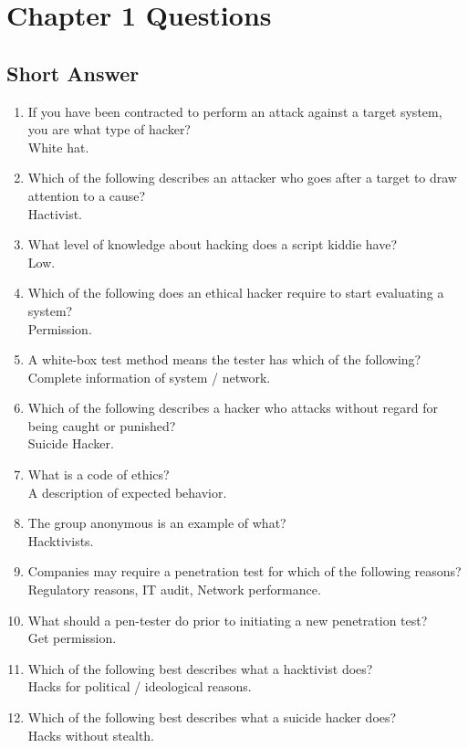 \section{Chapter 1 Questions}
\subsection{Short Answer}
\begin{enumerate}
    \item If you have been contracted to perform an attack against a target system, you are what type of hacker?\\White hat.
    \item Which of the following describes an attacker who goes after a target to draw attention to a cause?\\Hactivist.
    \item What level of knowledge about hacking does a script kiddie have?\\Low.
    \item Which of the following does an ethical hacker require to start evaluating a system?\\Permission.
    \item A white-box test method means the tester has which of the following?\\Complete information of system / network.
    \item Which of the following describes a hacker who attacks without regard for being caught or punished?\\Suicide Hacker.
    \item What is a code of ethics?\\A description of expected behavior.
    \item The group anonymous is an example of what?\\Hacktivists.
    \item Companies may require a penetration test for which of the following reasons?\\Regulatory reasons, IT audit, Network performance.
    \item What should a pen-tester do prior to initiating a new penetration test?\\Get permission.
    \item Which of the following best describes what a hacktivist does?\\Hacks for political / ideological reasons.
    \item Which of the following best describes what a suicide hacker does?\\Hacks without stealth.

\end{enumerate}
